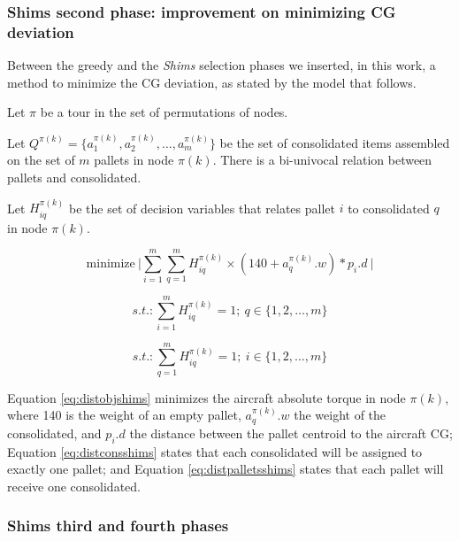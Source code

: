 \documentclass[preprint,authoryear]{elsarticle}
\begin{document}
\subsubsection{Shims second phase: improvement on minimizing CG deviation}

Between the greedy and the {\it Shims} selection phases we inserted, in this work, a method to minimize the CG deviation, as stated by the model that follows.

Let $\pi$ be a tour in the set of permutations of nodes.

Let $Q^{\pi(k)}  = \{ a^{\pi(k)}_1, a^{\pi(k)}_2, \ldots, a^{\pi(k)}_m \}$ be the set of consolidated items assembled on the set of $m$ pallets in node $\pi(k)$. There is a bi-univocal relation between pallets and consolidated.

Let $H^{\pi(k)}_{iq}$ be the set of decision variables that relates pallet $i$ to consolidated $q$ in node $\pi(k)$.

\begin{equation} \label{eq:distobjshims}
	\mbox{minimize}\ \Bigg |  \sum_{i=1}^{m} \sum_{q=1}^{m} H^{\pi(k)}_{iq} \times  (140 + a^{\pi(k)}_q.w) * p_i.d\ \Bigg | 
\end{equation}

\begin{equation} \label{eq:distconsshims}
	s.t.: \sum_{i=1}^{m} H^{\pi(k)}_{iq} = 1;\ q \in \{1,2,\ldots,m\}
\end{equation}

\begin{equation} \label{eq:distpalletsshims}
	s.t.: \sum_{q=1}^{m} H^{\pi(k)}_{iq}=1;\ i \in \{1,2,\ldots,m\}
\end{equation}

Equation \ref{eq:distobjshims} minimizes the aircraft absolute torque in node $\pi(k)$, where 140 is the weight of an empty pallet, $a^{\pi(k)}_q.w$ the weight of the consolidated, and $p_i.d$ the distance between the pallet centroid to the aircraft CG; Equation \ref{eq:distconsshims} states that each consolidated will be assigned to exactly one pallet; and Equation \ref{eq:distpalletsshims} states that each pallet will receive one consolidated.


\subsubsection{Shims third and fourth phases}
\end{document}
